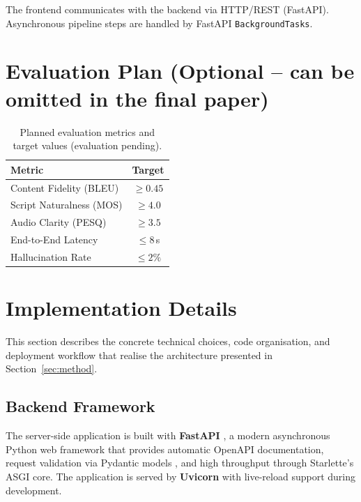 \documentclass[sigconf,natbib=false]{acmart}   %
\begin{document}
The frontend communicates with the backend via HTTP/REST (FastAPI).  Asynchronous pipeline steps are handled by FastAPI \texttt{BackgroundTasks}.

\section{Evaluation Plan (Optional -- can be omitted in the final paper)}
\begin{table}[H]
\centering
\begin{tabular}{lc}
\toprule
\textbf{Metric} & \textbf{Target}\\
\midrule
Content Fidelity (BLEU)      & $\ge 0.45$ \\
Script Naturalness (MOS)    & $\ge 4.0$  \\
Audio Clarity (PESQ)         & $\ge 3.5$  \\
End-to-End Latency          & $\le 8$\,s  \\
Hallucination Rate          & $\le 2\%$ \\
\bottomrule
\end{tabular}
\caption{Planned evaluation metrics and target values (evaluation pending).}
\label{tab:evaluation}
\end{table}


\section{Implementation Details}
\label{sec:implementation}

This section describes the concrete technical choices, code organisation, and deployment workflow that realise the architecture presented in Section~\ref{sec:method}.

\subsection{Backend Framework}
The server-side application is built with \textbf{FastAPI} \cite{FastAPI2024}, a modern asynchronous Python web framework that provides automatic OpenAPI documentation, request validation via Pydantic models \cite{Pydantic2024}, and high throughput through Starlette's ASGI core.  The application is served by \textbf{Uvicorn} with live-reload support during development.
\end{document}

